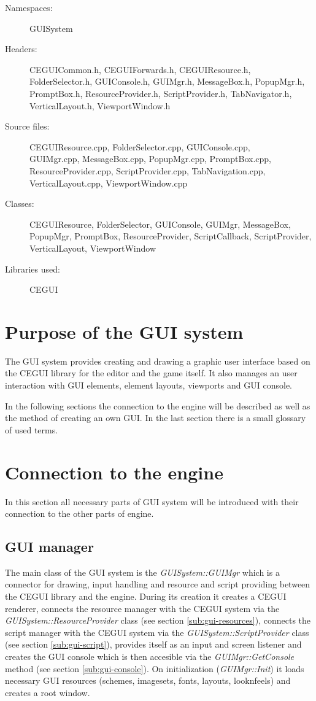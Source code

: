 \begin{description}
  \item[Namespaces:] GUISystem
  \item[Headers:] CEGUICommon.h, CEGUIForwards.h, CEGUIResource.h, FolderSelector.h, GUIConsole.h, GUIMgr.h, MessageBox.h, PopupMgr.h, Prompt\-Box.h, ResourceProvider.h, ScriptProvider.h, TabNavigator.h, VerticalLayout.h, ViewportWindow.h
  \item[Source files:] CEGUIResource.cpp, FolderSelector.cpp, GUIConsole.cpp, \\GUIMgr.cpp, MessageBox.cpp, PopupMgr.cpp, PromptBox.cpp, Re\-sourceProvider.cpp, ScriptProvider.cpp, TabNavigation.cpp, Ver\-ti\-cal\-Layout.cpp, ViewportWindow.cpp
  \item[Classes:] CEGUIResource, FolderSelector, GUIConsole, GUIMgr, MessageBox, PopupMgr, PromptBox, ResourceProvider, ScriptCallback, ScriptProvider, VerticalLayout, ViewportWindow
  \item[Libraries used:] CEGUI
\end{description}

\section{Purpose of the GUI system}

The GUI system provides creating and drawing a graphic user interface based on the CEGUI library for the editor and the game itself. It also manages an user interaction with GUI elements, element layouts, viewports and GUI console.

In the following sections the connection to the engine will be described as well as the method of creating an own GUI. In the last section there is a small glossary of used terms.

\section{Connection to the engine}

In this section all necessary parts of GUI system will be introduced with their connection to the other parts of engine.

\subsection{GUI manager}

The main class of the GUI system is the \emph{GUISystem::GUIMgr} which is a connector for drawing, input handling and resource and script providing between the CEGUI library and the engine. During its creation it creates a CEGUI renderer, connects the resource manager with the CEGUI system via the \emph{GUISystem::Resource\-Provider} class (see section \ref{sub:gui-resources}), connects the script manager with the CEGUI system via the \emph{GUISystem::ScriptProvider} class (see section \ref{sub:gui-script}), provides itself as an input and screen listener and creates the GUI console which is then accesible via the \emph{GUIMgr::GetConsole} method (see section \ref{sub:gui-console}). On initialization (\emph{GUIMgr::Init}) it loads necessary GUI resources (schemes, imagesets, fonts, layouts, looknfeels) and creates a root window.

